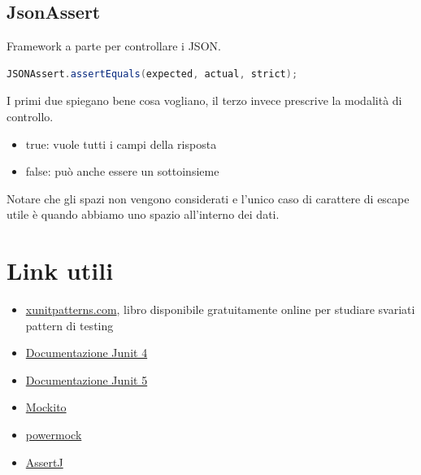 \documentclass[11pt,a4paper]{book}
\begin{document}
\section{JsonAssert}
Framework a parte per controllare i JSON.

\begin{lstlisting}[language = Java]
JSONAssert.assertEquals(expected, actual, strict);
\end{lstlisting}
I primi due spiegano bene cosa vogliano, il terzo invece prescrive la modalità di controllo.
\begin{itemize}
	\item true: vuole tutti i campi della risposta
	\item false: può anche essere un sottoinsieme
\end{itemize}

Notare che gli spazi non vengono considerati e l'unico caso di carattere di escape utile è quando abbiamo uno spazio all'interno dei dati.



\chapter*{Link utili}
\begin{itemize}
	\item[] \href{http://xunitpatterns.com/}{xunitpatterns.com}, libro disponibile gratuitamente online per studiare svariati pattern di testing
	\item[] \href{https://junit.org/junit4/}{Documentazione Junit 4}
	\item[] \href{https://junit.org/junit5/}{Documentazione Junit 5}
	\item[] \href{https://site.mockito.org/}{Mockito}
	\item[] \href{https://github.com/powermock/powermock}{powermock}
	\item[] \href{https://joel-costigliola.github.io/assertj/}{AssertJ}
	
\end{itemize}
\end{document}
